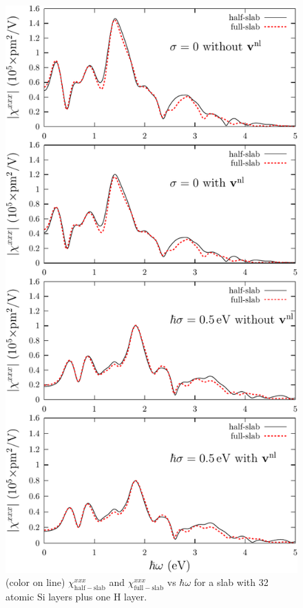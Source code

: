 \documentclass[floatfix,prb,aps,superscriptaddress,showpacs,11pt,preprint,letterpaper]{revtex4}
\begin{document}
\begin{figure}
\centering 
\includegraphics[scale=.8]{plots/fig2}
\caption{(color on line) 
$\chi^{xxx}_{\mathrm{half-slab}}$
and 
$\chi^{xxx}_{\mathrm{full-slab}}$
vs $\hbar\omega$ for a slab with 32 
atomic Si layers plus one H layer. 
\label{fig2}} 
\end{figure}
\end{document}
